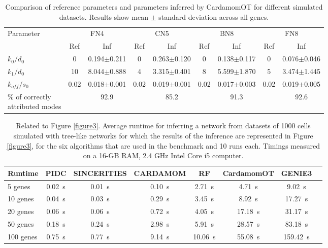 \begin{table}[ht]
\centering
\caption{Comparison of reference parameters and parameters inferred by CardamomOT for different simulated datasets. Results show mean $\pm$ standard deviation across all genes.}
\label{tableS1}
\small
\begin{tabular}{|l|cc|cc|cc|cc|}
\hline
\multirow{2}{*}{Parameter} & \multicolumn{2}{c|}{FN4} & \multicolumn{2}{c|}{CN5} & \multicolumn{2}{c|}{BN8} & \multicolumn{2}{c|}{FN8} \\
\cline{2-9}
& Ref & Inf & Ref & Inf & Ref & Inf & Ref & Inf \\
\hline
$k_0 /d_0$ & 0 & 0.194$\pm$0.211 & 0 & 0.263$\pm$0.120 & 0 & 0.138$\pm$0.117 & 0 & 0.076$\pm$0.046 \\
$k_1 /d_0$ & 10 & 8.044$\pm$0.888 & 4 & 3.315$\pm$0.401 & 8 & 5.599$\pm$1.870 & 5 & 3.474$\pm$1.445 \\
$k_{off}/s_0$ & 0.02 & 0.018$\pm$0.001 & 0.02 & 0.019$\pm$0.001 & 0.02 & 0.017$\pm$0.003 & 0.02 & 0.019$\pm$0.005 \\
\shortstack[l]{\% of correctly\\attributed modes} &  & 92.9 &  & 85.2 &  & 91.3 &  & 92.6 \\
\hline
\end{tabular}
\end{table}


\begin{table}[ht]
\centering
\caption{Related to Figure \ref{figure3}. Average runtime for inferring a network from datasets of 1000 cells simulated with tree-like networks for which the results of the inference are represented in Figure \ref{figure3}, for the six algorithms that are used in the benchmark and 10 runs each. Timings measured on a 16-GB RAM, 2.4 GHz Intel Core i5 computer.}
\label{tableS2}
\small\begin{tabular}{|l|c|c|c|c|c|c|c|}
\hline
Runtime & PIDC & SINCERITIES & CARDAMOM & RF & \textbf{CardamomOT} & GENIE3 \\
\hline
5 genes & \SI{0.02}{s} & \SI{0.01}{s} & \SI{0.10}{s} & \SI{2.71}{s} & \SI{4.71}{s} & \SI{9.02}{s}\\
10 genes & \SI{0.04}{s} & \SI{0.03}{s} & \SI{0.29}{s} & \SI{3.45}{s} & \SI{8.92}{s} & \SI{17.27}{s}\\
20 genes & \SI{0.06}{s} & \SI{0.06}{s} & \SI{0.72}{s} & \SI{4.05}{s} & \SI{17.18}{s} & \SI{31.17}{s}\\
50 genes & \SI{0.18}{s} & \SI{0.24}{s} & \SI{2.98}{s} & \SI{5.91}{s} & \SI{28.57}{s} & \SI{83.18}{s}\\
100 genes & \SI{0.75}{s} & \SI{0.77}{s} & \SI{9.14}{s} & \SI{10.06}{s} & \SI{55.08}{s} & \SI{159.42}{s} \\
\hline
\end{tabular}
\end{table}

